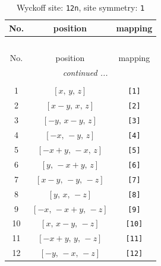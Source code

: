 \documentclass[fleqn,8pt]{jsarticle}
\begin{document}
\begin{longtable}{ccc}
\caption{Wyckoff site: {\tt 12n}, site symmetry: {\tt 1}}
 \\
 \hline \hline
No. & position & mapping \\ \hline \endfirsthead

\multicolumn{2}{l}{\tablename\ \thetable{}} \\
 \hline \hline
No. & position & mapping \\ \hline \endhead

 \hline \hline
\multicolumn{2}{r}{\footnotesize\it continued ...} \\ \endfoot

 \hline \hline
\multicolumn{2}{r}{} \\ \endlastfoot

1 & $\left[ x,\, y,\, z \right]$ & {\tt [1]} \\ \hline
2 & $\left[ x - y,\, x,\, z \right]$ & {\tt [2]} \\ \hline
3 & $\left[ - y,\, x - y,\, z \right]$ & {\tt [3]} \\ \hline
4 & $\left[ - x,\, - y,\, z \right]$ & {\tt [4]} \\ \hline
5 & $\left[ - x + y,\, - x,\, z \right]$ & {\tt [5]} \\ \hline
6 & $\left[ y,\, - x + y,\, z \right]$ & {\tt [6]} \\ \hline
7 & $\left[ x - y,\, - y,\, - z \right]$ & {\tt [7]} \\ \hline
8 & $\left[ y,\, x,\, - z \right]$ & {\tt [8]} \\ \hline
9 & $\left[ - x,\, - x + y,\, - z \right]$ & {\tt [9]} \\ \hline
10 & $\left[ x,\, x - y,\, - z \right]$ & {\tt [10]} \\ \hline
11 & $\left[ - x + y,\, y,\, - z \right]$ & {\tt [11]} \\ \hline
12 & $\left[ - y,\, - x,\, - z \right]$ & {\tt [12]} \\
\end{longtable}
\end{document}
